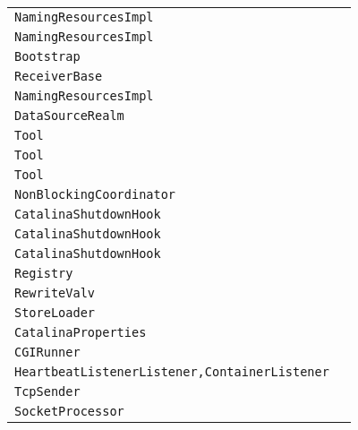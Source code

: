 \begin{center}
\begin{tabular}{ll}
\lstinline/NamingResourcesImpl/&\raisebox{0pt}{\lstinline/ destroyInternal())/}\\ 
\lstinline/NamingResourcesImpl/&\raisebox{0pt}{\lstinline/ destroyInternal())/}\\ 
\lstinline/Bootstrap/&\raisebox{0pt}{\lstinline/ main(Stringargs[])/}\\ 
\lstinline/ReceiverBase/&\raisebox{0pt}{\lstinline/ intbindUdp(DatagramSocket)/}\\ 
\lstinline/NamingResourcesImpl/&\raisebox{0pt}{\lstinline/ destroyInternal())/}\\ 
\lstinline/DataSourceRealm/&\raisebox{0pt}{\lstinline/ getRoles(Connection,String)/}\\ 
\lstinline/Tool/&\raisebox{0pt}{\lstinline/ usage()/}\\ 
\lstinline/Tool/&\raisebox{0pt}{\lstinline/ usage()/}\\ 
\lstinline/Tool/&\raisebox{0pt}{\lstinline/ usage()/}\\ 
\lstinline/NonBlockingCoordinator/&\raisebox{0pt}{\lstinline/ fireInterceptorEvent(InterceptorEvent)/}\\ 
\lstinline/CatalinaShutdownHook/&\raisebox{0pt}{\lstinline/ run()/}\\ 
\lstinline/CatalinaShutdownHook/&\raisebox{0pt}{\lstinline/ run()/}\\ 
\lstinline/CatalinaShutdownHook/&\raisebox{0pt}{\lstinline/ run()/}\\ 
\lstinline/Registry/&\raisebox{0pt}{\lstinline/ loadDescriptors(String)/}\\ 
\lstinline/RewriteValv/&\raisebox{0pt}{\lstinline/ parse(BufferedReader))/}\\ 
\lstinline/StoreLoader/&\raisebox{0pt}{\lstinline/ load()/}\\ 
\lstinline/CatalinaProperties/&\raisebox{0pt}{\lstinline/ loadProperties()/}\\ 
\lstinline/CGIRunner/&\raisebox{0pt}{\lstinline/ sendToLog(BufferedReader)/}\\ 
\lstinline/HeartbeatListenerListener,ContainerListener/&\raisebox{0pt}{\lstinline/ lifecycleEvent(LifecycleEvent)/}\\ 
\lstinline/TcpSender/&\raisebox{0pt}{\lstinline/ intsend(String))/}\\ 
\lstinline/SocketProcessor/&\raisebox{0pt}{\lstinline/ doRun()/}\\ 


\bottomrule
\end{tabular}
\end{center}


